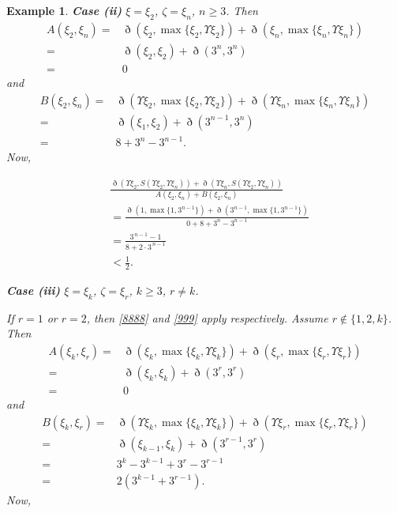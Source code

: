 \documentclass[pdflatex,sn-mathphys-num]{sn-jnl}%
\theoremstyle{thmstyleone}%
\theoremstyle{thmstyletwo}%
\newtheorem{example}{Example}%
\theoremstyle{thmstylethree}%
\begin{document}
\begin{example}
\medskip
\noindent
\textbf{Case (ii)} $\xi =\xi_2$, $\zeta =\xi_n$, $n\ge3$. Then
\begin{equation*}
    \begin{split}
        A(\xi_2,\xi_n)=&\eth(\xi_2,\max \{\xi_2,\Upsilon \xi _2\})+\eth(\xi_n,\max \{\xi_n,\Upsilon \xi _n\})\\
        =& \eth(\xi_2,\xi_2)+\eth(3^n,3^n)\\
        =&0
    \end{split}
\end{equation*}
and 
\begin{equation*}
    \begin{split}
        B(\xi_2,\xi_n)=&\eth(\Upsilon \xi_2,\max \{\xi_2,\Upsilon \xi _2\})+\eth(\Upsilon \xi_n,\max \{\xi_n,\Upsilon \xi _n\})\\
        =&\eth(\xi_1,\xi_2)+\eth(3^{n-1},3^{n})\\
        =&8+3^n-3^{n-1}.
    \end{split}
\end{equation*}
Now, 

\begin{equation}\label{999}
    \begin{split}
        &\frac{\eth(\Upsilon \xi_2,S(\Upsilon \xi_2,\Upsilon \xi _n))+\eth(\Upsilon \xi_n,S(\Upsilon \xi_2,\Upsilon \xi _n))}
     {A(\xi_2,\xi_n)+B(\xi_2,\xi_n)}\\
&=\frac{\eth(1,\max\{1,3^{n-1} \})+\eth(3^{n-1},\max\{1,3^{n-1} \})}{0+8+3^n-3^{n-1}}\\
&=
\frac{3^{\,n-1}-1}{8+2\cdot 3^{\,n-1}}\\
&<\frac12.
    \end{split}
\end{equation}

\medskip
\noindent
\textbf{Case (iii)} $\xi =\xi_k$, $\zeta =\xi_r$, $k\ge3$, $r\ne k$.

If $r=1$ or $r=2$, then \eqref{8888} and \eqref{999} apply respectively.
Assume $r\notin\{1,2,k\}$. Then
\begin{equation*}
    \begin{split}
        A(\xi_k,\xi_r)=&\eth(\xi_k,\max \{\xi_k,\Upsilon \xi _k\})+\eth(\xi_r,\max \{\xi_r,\Upsilon \xi_r\})\\
        =& \eth(\xi_k,\xi_k)+\eth(3^r,3^r)\\
        =&0
    \end{split}
\end{equation*}
and 
\begin{equation*}
    \begin{split}
        B(\xi_k,\xi_r)=&\eth(\Upsilon \xi_k,\max \{\xi_k,\Upsilon \xi _k\})+\eth(\Upsilon \xi_r,\max \{\xi_r,\Upsilon \xi _r\})\\
        =&\eth(\xi_{k-1},\xi_k)+\eth(3^{r-1},3^{r})\\
        =&3^k-3^{k-1}+3^r-3^{r-1}\\
        =& 2(3^{k-1}+3^{r-1}).
    \end{split}
\end{equation*}
Now, 


\end{example}
\end{document}
